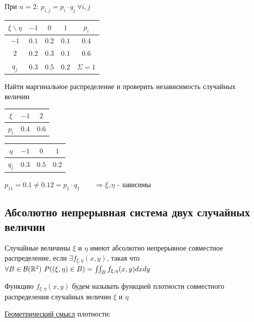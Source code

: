 \documentclass[12pt]{article}
\begin{document}
    При $n = 2$: $p_{i, j} = p_i \cdot q_j \ \forall i, j$

    \Ex

    \begin{tabular}{c|c|c|c|c}
        $\xi \backslash \eta$ & $-1$ & $0$ & $1$ & $p_i$ \\
        \hline
        $-1$ & $0.1$ & $0.2$ & $0.1$ & $0.4$ \\
        \hline
        $2$ & $0.2$ & $0.3$ & $0.1$ & $0.6$ \\
        \hline
        $q_j$ & $0.3$ & $0.5$ & $0.2$ & $\Sigma = 1$ \\
    \end{tabular}

    Найти маргинальное распределение и проверить независимость случайных величин


    \begin{tabular}{c|c|c}
        $\xi$ & $-1$ & $2$ \\
        \hline
        $p_i$ & $0.4$ & $0.6$  \\
    \end{tabular}

    \begin{tabular}{c|c|c|c}
        $\eta$ & $-1$ & $0$ & $1$ \\
        \hline
        $q_j$ & $0.3$ & $0.5$ & $0.2$  \\
    \end{tabular}

    $p_{11} = 0.1 \neq 0.12 = p_1 \cdot q_1 \qquad \Longrightarrow \xi, \eta$ - зависимы

    \subsection{Абсолютно непрерывная система двух случайных величин}

    \Def Случайные величины $\xi$ и $\eta$ имеют абсолютно непрерывное совместное распределение, если
    $\exists f_{\xi, \eta}(x, y)$, такая что $\forall B \in \mathcal{B}(\mathbb{R}^2) \ P((\xi, \eta) \in B) = \iint_B f_{\xi, \eta}(x, y) dxdy$

    Функцию $f_{\xi, \eta}(x, y)$ будем называть функцией плотности совместного распределения случайных величин $\xi$ и $\eta$

    \underline{Геометрический смысл} плотности: 
    
\end{document}
